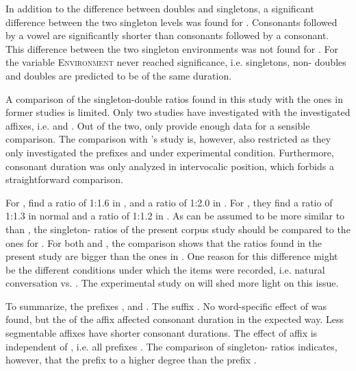 In addition to the difference between doubles and singletons, a significant difference between the two singleton levels was found for . Consonants followed by a vowel are significantly shorter than consonants followed by a consonant. This difference between the two singleton environments was not found for . For  the variable \textsc{Environment} never reached significance, i.e. singletons, non- doubles and  doubles are predicted to be of the same duration.

 A comparison of the singleton-double ratios found in this study with the ones in former studies is limited. Only two studies have investigated  with the investigated affixes, i.e. \cite{Kaye.2005} and \cite{Oh.2012}. Out of the two, only \cite{Oh.2012} provide enough data for a sensible comparison. The comparison with \citeauthor{Oh.2012}'s study is, however, also restricted as they only investigated the prefixes  and  under experimental condition. Furthermore, consonant duration was only analyzed in intervocalic position, which forbids a straightforward comparison. 
 
 For , \cite{Oh.2012} find a ratio of 1:1.6 in , and a ratio of 1:2.0 in . For , they find a ratio of 1:1.3 in normal and a ratio of 1:1.2 in . 
 As  can be assumed to be more similar to  than , the singleton- ratios of the present corpus study should be compared to the ones for . 
 For both  and , the comparison shows that the ratios found in the present study are bigger than the ones in \cite{Oh.2012}. 
  One reason for this difference might be the different conditions under which the items were recorded, i.e. natural conversation vs. . The experimental study on  will shed more light on this issue.

To summarize, the prefixes ,  and  . The suffix  . No word-specific effect of  was found, but the  of the affix affected consonant duration in the expected way. Less segmentable affixes have shorter consonant durations. The effect of affix is independent of , i.e. all prefixes . The comparison of singleton- ratios indicates, however, that the prefix   to a higher degree than the prefix .

